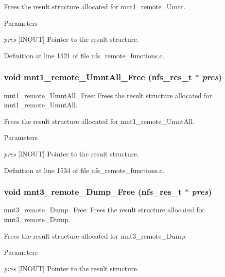 Frees the result structure allocated for mnt1\_\-remote\_\-Umnt.


\begin{DoxyParams}{Parameters}
\item[{\em pres}][INOUT] Pointer to the result structure. \end{DoxyParams}


Definition at line 1521 of file nfs\_\-remote\_\-functions.c.
\subsubsection[{mnt1\_\-remote\_\-UmntAll\_\-Free}]{\setlength{\rightskip}{0pt plus 5cm}void mnt1\_\-remote\_\-UmntAll\_\-Free (nfs\_\-res\_\-t $\ast$ {\em pres})}\label{group__NFSprocs_ga0d161d9c8247e1cea6c02ef2fc9def4f}
mnt1\_\-remote\_\-UmntAll\_\-Free: Frees the result structure allocated for mnt1\_\-remote\_\-UmntAll.

Frees the result structure allocated for mnt1\_\-remote\_\-UmntAll.


\begin{DoxyParams}{Parameters}
\item[{\em pres}][INOUT] Pointer to the result structure. \end{DoxyParams}


Definition at line 1534 of file nfs\_\-remote\_\-functions.c.
\subsubsection[{mnt3\_\-remote\_\-Dump\_\-Free}]{\setlength{\rightskip}{0pt plus 5cm}void mnt3\_\-remote\_\-Dump\_\-Free (nfs\_\-res\_\-t $\ast$ {\em pres})}\label{group__NFSprocs_ga6a89ecdac7c805814eff7333f49d1329}
mnt3\_\-remote\_\-Dump\_\-Free: Frees the result structure allocated for mnt3\_\-remote\_\-Dump.

Frees the result structure allocated for mnt3\_\-remote\_\-Dump.


\begin{DoxyParams}{Parameters}
\item[{\em pres}][INOUT] Pointer to the result structure. \end{DoxyParams}



